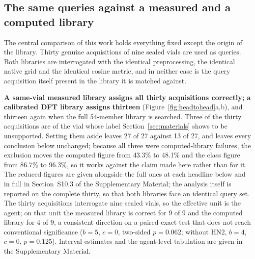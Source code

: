 \documentclass[review,12pt]{elsarticle}
\begin{document}
\subsection{The same queries against a measured and a computed library}
\label{sec:headtohead}

The central comparison of this work holds everything fixed except the origin of the
library. Thirty genuine acquisitions of nine sealed vials are used as queries. Both libraries
are interrogated with the identical preprocessing, the identical native grid and the
identical cosine metric, and in neither case is the query acquisition itself present in
the library it is matched against.

\textbf{A same-vial measured library assigns all thirty acquisitions correctly; a
calibrated DFT library assigns thirteen} (Figure~\ref{fig:headtohead}a,b), and thirteen again when the full
54-member library is searched. Three of the thirty acquisitions are of the vial whose label
Section~\ref{sec:materials} shows to be unsupported. Setting them aside leaves 27 of 27
against 13 of 27, and leaves every conclusion below unchanged; because all three were
computed-library failures, the exclusion moves the computed figure from 43.3\% to 48.1\%
and the class figure from 86.7\% to 96.3\%, so it works against the claim made here rather
than for it. The reduced figures are given alongside the full ones at each headline below
and in full in Section~S10.3 of the Supplementary Material; the analysis itself is reported on the complete
thirty, so that both libraries face an identical query set. The thirty acquisitions interrogate nine sealed vials, so
the effective unit is the agent; on that unit the measured library is correct for 9 of 9
and the computed library for 4 of 9, a consistent direction on a paired exact test that
does not reach conventional significance ($b = 5$, $c = 0$, two-sided $p = 0.062$; without
HN2, $b = 4$, $c = 0$, $p = 0.125$). Interval estimates and the agent-level tabulation are
given in the Supplementary Material.
\end{document}
